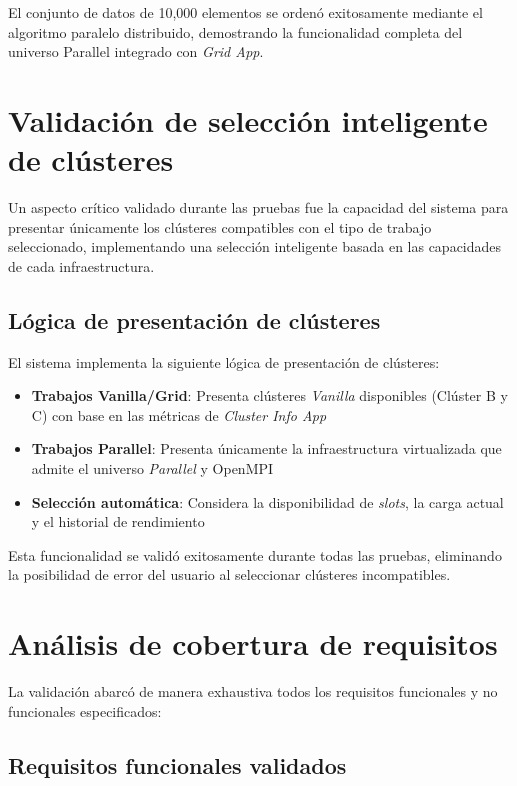 El conjunto de datos de 10,000 elementos se ordenó exitosamente mediante el algoritmo paralelo distribuido, demostrando la funcionalidad completa del universo Parallel integrado con \textit{Grid App}.

\section{Validación de selección inteligente de clústeres}
\noindent

Un aspecto crítico validado durante las pruebas fue la capacidad del sistema para presentar únicamente los clústeres compatibles con el tipo de trabajo seleccionado, implementando una selección inteligente basada en las capacidades de cada infraestructura.

\subsection{Lógica de presentación de clústeres}
\noindent

El sistema implementa la siguiente lógica de presentación de clústeres:

\begin{itemize}
	\item \textbf{Trabajos Vanilla/Grid}: Presenta clústeres \textit{Vanilla} disponibles (Clúster B y C) con base en las métricas de \textit{Cluster Info App}
	\item \textbf{Trabajos Parallel}: Presenta únicamente la infraestructura virtualizada que admite el universo \textit{Parallel} y OpenMPI
	\item \textbf{Selección automática}: Considera la disponibilidad de \textit{slots}, la carga actual y el historial de rendimiento
\end{itemize}

Esta funcionalidad se validó exitosamente durante todas las pruebas, eliminando la posibilidad de error del usuario al seleccionar clústeres incompatibles.

\section{Análisis de cobertura de requisitos}
\noindent

La validación abarcó de manera exhaustiva todos los requisitos funcionales y no funcionales especificados:

\subsection{Requisitos funcionales validados}
\noindent

